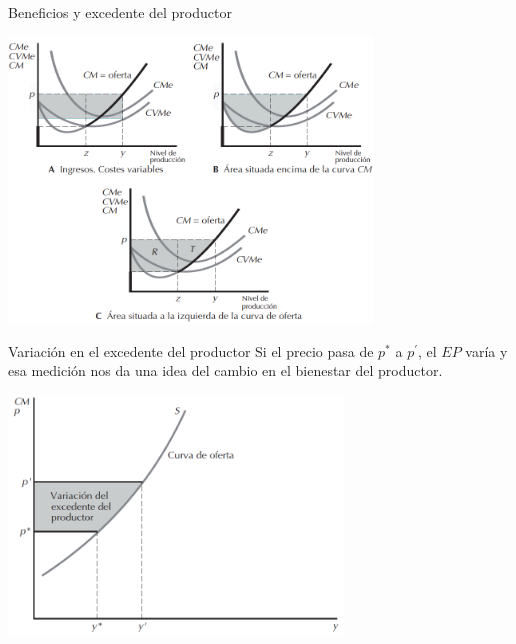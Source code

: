 \documentclass{beamer}
\theoremstyle{definition}
\begin{document}

\begin{frame}{Beneficios y excedente del productor}
\begin{center}
\includegraphics[width=3.8in]{figures4/EP.png}
\end{center}
\end{frame}


\begin{frame}{Variaci\'on en el excedente del productor}
Si el precio pasa de $p^*$ a $p^{'}$, el $EP$ varía y esa medición nos da una idea del cambio en el bienestar del productor.
\begin{center}
\includegraphics[width=3.5in]{figures4/varEP.png}
\end{center}
\end{frame}
\end{document}
